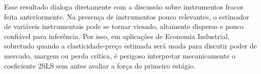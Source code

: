 \documentclass[12pt,a4paper]{article}
\begin{document}
\begin{enumerate}[label=\textbf{\arabic*.}]
Esse resultado dialoga diretamente com a discussão sobre instrumentos fracos feita anteriormente. Na presença de instrumentos pouco relevantes, o estimador de variáveis instrumentais pode se tornar viesado, altamente disperso e pouco confiável para inferência. Por isso, em aplicações de Economia Industrial, sobretudo quando a elasticidade-preço estimada será usada para discutir poder de mercado, margem ou perda crítica, é perigoso interpretar mecanicamente o coeficiente 2SLS sem antes avaliar a força do primeiro estágio.

\end{enumerate}
\end{document}
